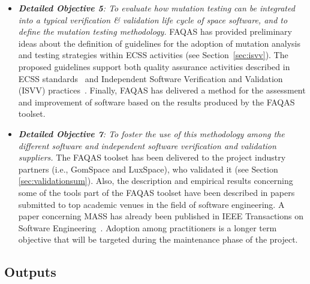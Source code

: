 \begin{itemize}
\item {\emph{\textbf{Detailed Objective 5}: To evaluate how mutation testing can be integrated into a typical verification \& validation life cycle of space software, and to define the mutation testing methodology.}} FAQAS has provided preliminary ideas about the definition of guidelines for the adoption of mutation analysis and testing strategies within ECSS activities (see Section~\ref{sec:isvv}). The proposed guidelines support both quality assurance activities described in ECSS standards~\cite{ecss40C,ecss80C} and Independent Software Verification and Validation (ISVV) practices~\cite{ESAISVV}. Finally, FAQAS has delivered a method for the assessment and improvement of software based on the results produced by the FAQAS toolset.

\item {\emph{\textbf{Detailed Objective 7}: To foster the use of this methodology among the different software and independent software verification and validation suppliers.}} The FAQAS toolset has been delivered to the project industry partners (i.e., GomSpace and LuxSpace), who validated it  (see Section \ref{sec:validationsum}). Also, the description and empirical results concerning some of the tools part of the FAQAS toolset have been described in papers submitted to top academic venues in the field of software engineering. A paper concerning MASS has already been published in IEEE Transactions on Software Engineering~\cite{Oscar:MASS:TSE}. Adoption among practitioners is a longer term objective that will be targeted during the maintenance phase of the project.

\end{itemize}



\subsection{Outputs}

